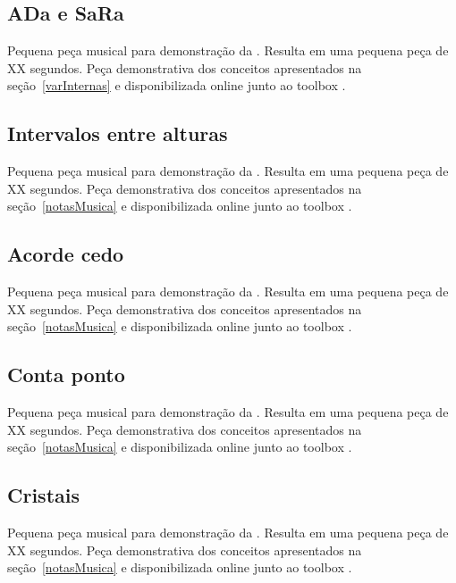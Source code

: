\subsection{ADa e SaRa}\label{ap:ada}
Pequena peça musical para demonstração da . Resulta em uma pequena peça de XX segundos. Peça demonstrativa dos conceitos apresentados na seção~\ref{varInternas} e disponibilizada online junto ao toolbox \massa.



\subsection{Intervalos entre alturas}\label{ap:intervalos}
Pequena peça musical para demonstração da . Resulta em uma pequena peça de XX segundos. Peça demonstrativa dos conceitos apresentados na seção~\ref{notasMusica} e disponibilizada online junto ao toolbox \massa.


\subsection{Acorde cedo}\label{ap:acorde}
Pequena peça musical para demonstração da . Resulta em uma pequena peça de XX segundos. Peça demonstrativa dos conceitos apresentados na seção~\ref{notasMusica} e disponibilizada online junto ao toolbox \massa.


\subsection{Conta ponto}\label{ap:conta}
Pequena peça musical para demonstração da . Resulta em uma pequena peça de XX segundos. Peça demonstrativa dos conceitos apresentados na seção~\ref{notasMusica} e disponibilizada online junto ao toolbox \massa.



\subsection{Cristais}\label{ap:cristais}
Pequena peça musical para demonstração da . Resulta em uma pequena peça de XX segundos. Peça demonstrativa dos conceitos apresentados na seção~\ref{notasMusica} e disponibilizada online junto ao toolbox \massa.


